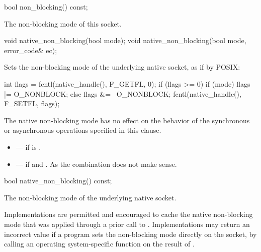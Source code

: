 \begin{itemdecl}
bool non_blocking() const;
\end{itemdecl}

\begin{itemdescr}
\pnum
\returns The non-blocking mode of this socket.
\end{itemdescr}

\begin{itemdecl}
void native_non_blocking(bool mode);
void native_non_blocking(bool mode, error_code& ec);
\end{itemdecl}

\begin{itemdescr}
\pnum
\effects Sets the non-blocking mode of the underlying native socket, as if by POSIX: 
\begin{codeblock}
int flags = fcntl(native_handle(), F_GETFL, 0);
if (flags >= 0)
{
  if (mode)
    flags |= O_NONBLOCK;
  else
    flags &= ~O_NONBLOCK;
  fcntl(native_handle(), F_SETFL, flags);
}
\end{codeblock}


\pnum
 The native non-blocking mode has no effect on the behavior of the synchronous or asynchronous operations specified in this clause.

\pnum
\errors
\begin{itemize}
\item
{} --- if  is .
\item
{} --- if  and . \enternote As the combination does not make sense. \exitnote
\end{itemize}
\end{itemdescr}

\begin{itemdecl}
bool native_non_blocking() const;
\end{itemdecl}

\begin{itemdescr}
\pnum
\returns The non-blocking mode of the underlying native socket.

\pnum
\remarks Implementations are permitted and encouraged to cache the native non-blocking mode that was applied through a prior call to . Implementations may return an incorrect value if a program sets the non-blocking mode directly on the socket, by calling an operating system-specific function on the result of .
\end{itemdescr}

